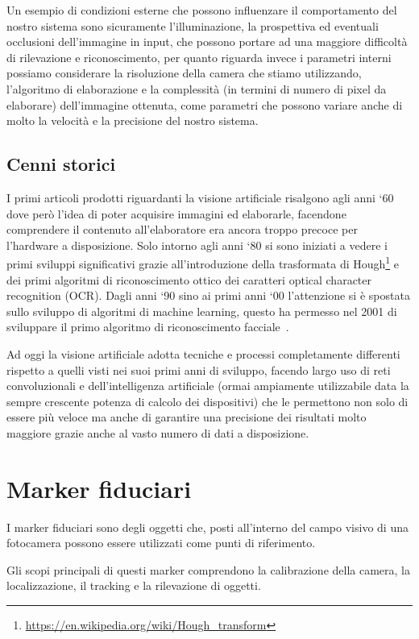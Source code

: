 \documentclass[12pt,a4paper,openright,twoside]{book}
\begin{document}
Un esempio di condizioni esterne che possono influenzare il comportamento del nostro sistema sono sicuramente l'illuminazione, la prospettiva ed eventuali occlusioni dell'immagine in input, che possono portare ad una maggiore difficoltà di rilevazione e riconoscimento, per quanto riguarda invece i parametri interni possiamo considerare la risoluzione della camera che stiamo utilizzando, l'algoritmo di elaborazione e la complessità (in termini di numero di pixel da elaborare) dell'immagine ottenuta, come parametri che possono variare anche di molto la velocità e la precisione del nostro sistema.

\subsection{Cenni storici}
I primi articoli prodotti riguardanti la visione artificiale risalgono agli anni `60 dove però l'idea di poter acquisire immagini ed elaborarle, facendone comprendere il contenuto all'elaboratore era ancora troppo precoce per l'hardware a disposizione.
Solo intorno agli anni `80 si sono iniziati a vedere i primi sviluppi significativi grazie all'introduzione della trasformata di Hough\footnote{\url{https://en.wikipedia.org/wiki/Hough_transform}}
e dei primi algoritmi di riconoscimento ottico dei caratteri optical character recognition (OCR).
Dagli anni `90 sino ai primi anni `00 l'attenzione si è spostata sullo sviluppo di algoritmi di machine learning, questo ha permesso nel 2001 di sviluppare il primo algoritmo di riconoscimento facciale~\cite{artificialVisionHistory}.

Ad oggi la visione artificiale adotta tecniche e processi completamente differenti rispetto a quelli visti nei suoi primi anni di sviluppo, facendo largo uso di reti convoluzionali e dell'intelligenza artificiale (ormai ampiamente utilizzabile data la sempre crescente potenza di calcolo dei dispositivi) che le permettono non solo di essere più veloce ma anche di garantire una precisione dei risultati molto maggiore grazie anche al vasto numero di dati a disposizione.

\section{Marker fiduciari} \label{sec:marker_fiduciari}
I marker fiduciari sono degli oggetti che, posti all'interno del campo visivo di una fotocamera possono essere utilizzati come punti di riferimento. 

Gli scopi principali di questi marker comprendono la calibrazione della camera, la localizzazione, il tracking e la rilevazione di oggetti.
\end{document}
